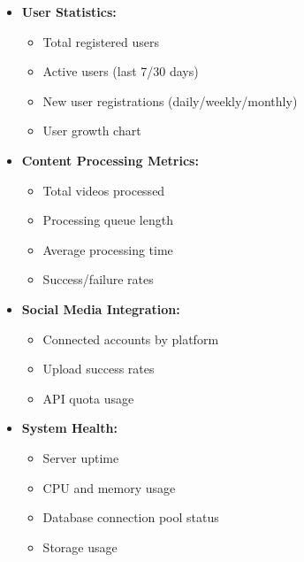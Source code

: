 \begin{itemize}
    \item \textbf{User Statistics:}
    \begin{itemize}
        \item Total registered users
        \item Active users (last 7/30 days)
        \item New user registrations (daily/weekly/monthly)
        \item User growth chart
    \end{itemize}
    
    \item \textbf{Content Processing Metrics:}
    \begin{itemize}
        \item Total videos processed
        \item Processing queue length
        \item Average processing time
        \item Success/failure rates
    \end{itemize}
    
    \item \textbf{Social Media Integration:}
    \begin{itemize}
        \item Connected accounts by platform
        \item Upload success rates
        \item API quota usage
    \end{itemize}
    
    \item \textbf{System Health:}
    \begin{itemize}
        \item Server uptime
        \item CPU and memory usage
        \item Database connection pool status
        \item Storage usage
    \end{itemize}
\end{itemize}

